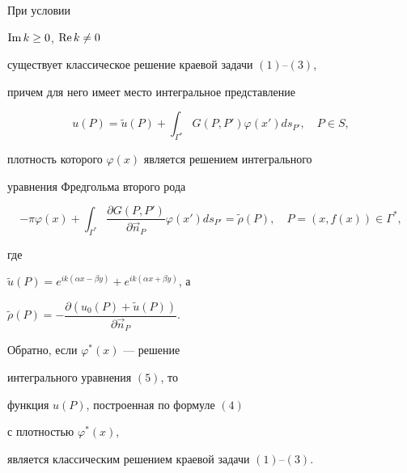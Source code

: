 \begin{thm}


При условии


$\operatorname{Im} k \geq 0$, $\operatorname{Re} k \ne 0$


существует классическое решение краевой задачи $(1)$--$(3)$,


причем для него имеет место интегральное представление


\begin{equation}


u (P) = \widetilde{u}(P) + \int_{\Gamma^\ast}


 G (P, P') \varphi (x') d s_{P'},


\quad P \in S,


\end{equation}


плотность которого $\varphi (x)$ является решением интегрального


уравнения Фредгольма второго рода


\begin{equation}


-\pi \varphi (x) + \int_{\Gamma^\ast}


\frac{\partial G (P, P')}{\partial \Vec{n}_{P}}


 \varphi (x') d s_{P'} = \widetilde{\rho} (P),


\quad P = (x,f(x)) \in \Gamma^\ast,


\end{equation}


где


$\widetilde{u}(P) = e^{i k (\alpha x - \beta y)} +


e^{i k (\alpha x + \beta y)}$, а


$\widetilde{\rho} (P) = - \dfrac{\partial (u_0 (P) +


\widetilde{u} (P))}{\partial \Vec{n}_{P}}$.





Обратно, если $\varphi^\ast (x)$ --- решение


интегрального уравнения $(5)$, то


функция $u (P)$, построенная по формуле $(4)$


с плотностью $\varphi^\ast (x)$,


является классическим решением краевой задачи $(1)$--$(3)$.


\end{thm}





